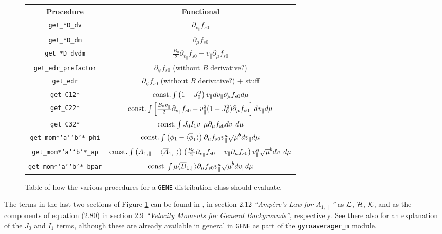     \begin{figure}[!h]
        \centering
        \begin{tabular}{ c | c }
            Procedure  &  Functional  \\
            \hline\hline
            {\tt get\_*D\_dv}  &  $\partial_{v_{\parallel}}f_{s0}$  \\
            \hline
            {\tt get\_*D\_dm}  &  $\partial_{\mu}f_{s0}$  \\
            \hline
            {\tt get\_*D\_dvdm}  &  $\frac{B_{0}}{2}\partial_{v_{\parallel}}f_{s0} - v_{\parallel}\partial_{\mu}f_{s0}$  \\
            \hline\hline
            {\tt get\_edr\_prefactor}  &  $\partial_{\psi}f_{s0}$ (without $B$ derivative?)  \\
            \hline
            {\tt get\_edr}  &  $\partial_{\psi}f_{s0}$ (without $B$ derivative?) + stuff  \\
            \hline\hline
            {\tt get\_C12*}  &  ${\rm const.}\int\left(1 - J_{0}^{2}\right)v_{\parallel}dv_{\parallel}\partial_{\mu}f_{s0}d\mu$  \\
            \hline
            {\tt get\_C22*}  &  ${\rm const.}\int\left[\frac{B_{0}v_{\parallel}}{2}\partial_{v_{\parallel}}f_{s0} - v_{\parallel}^{2}(1 - J_{0}^{2})\partial_{\mu}f_{s0}\right]dv_{\parallel}d\mu$  \\
            \hline
            {\tt get\_C32*}  &  ${\rm const.}\int J_{0}I_{1}v_{\parallel}\mu\partial_{\mu}f_{s0}dv_{\parallel}d\mu$  \\
            \hline\hline
            {\tt get\_mom*`a'`b'*\_phi}  &  ${\rm const.}\int \left(\phi_{1} - \langle\overline{\phi}_{1}\rangle\right)\partial_{\mu}f_{s0}v_{\parallel}^{a}\sqrt{\mu}^{b}dv_{\parallel}d\mu$  \\
            \hline
            {\tt get\_mom*`a'`b'*\_ap}  &  ${\rm const.}\int \left(A_{1, \parallel} - \langle\overline{A}_{1, \parallel}\rangle\right)\left(\frac{B_{0}}{2}\partial_{v_{\parallel}}f_{s0} - v_{\parallel}\partial_{\mu}f_{s0}\right)v_{\parallel}^{a}\sqrt{\mu}^{b}dv_{\parallel}d\mu$  \\
            \hline
            {\tt get\_mom*`a'`b'*\_bpar}  &  ${\rm const.}\int \mu\langle\overline{B}_{1, \parallel}\rangle\partial_{\mu}f_{s0}v_{\parallel}^{a}\sqrt{\mu}^{b}dv_{\parallel}d\mu$
        \end{tabular}
        \caption{Table of how the various procedures for a {\tt GENE} distribution class should evaluate.}
        \label{distribution procedures}
    \end{figure}
    
    The terms in the last two sections of Figure \ref{distribution procedures} can be found in \cite{Di20}, in section 2.12 \emph{``Ampère's Law for $A_{1, \parallel}$''} as $\mathcal{L}$, $\mathcal{H}$, $\mathcal{K}$, and as the components of equation (2.80) in section 2.9 \emph{``Velocity Moments for General Backgrounds''}, respectively. See there also for an explanation of the $J_{0}$ and $I_{1}$ terms, although these are already available in general in {\tt GENE} as part of the {\tt gyroaverager\_m} module.
